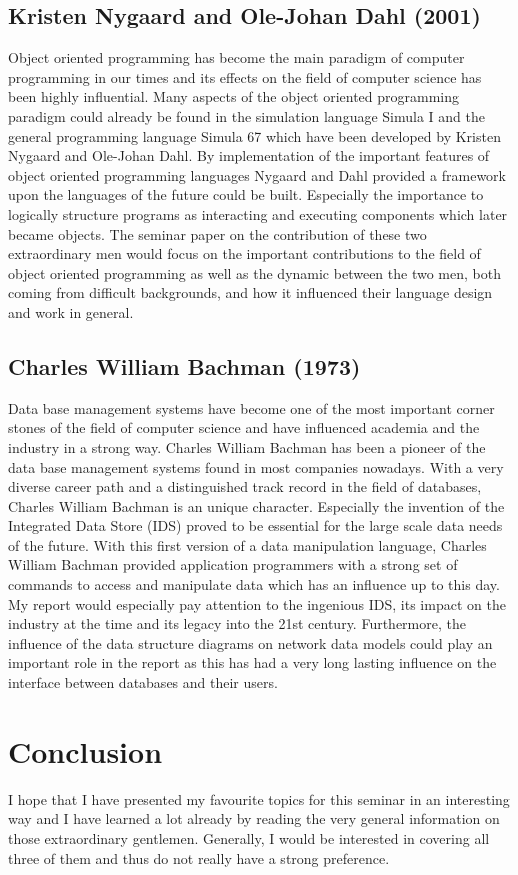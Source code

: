 \documentclass{article}
\begin{document}
\subsection{Kristen Nygaard and Ole-Johan Dahl (2001)}

Object oriented programming has become the main paradigm of computer programming in our times and its effects on the field of computer science has been highly influential. Many aspects of the object oriented programming paradigm could already be found in the simulation language Simula I and the general programming language Simula 67 which have been developed by Kristen Nygaard and Ole-Johan Dahl. By implementation of the important features of object oriented programming languages Nygaard and Dahl provided a framework upon the languages of the future could be built. Especially the importance to logically structure programs as interacting and executing components which later became objects. The seminar paper on the contribution of these two extraordinary men would focus on the important contributions to the field of object oriented programming as well as the dynamic between the two men, both coming from difficult backgrounds, and how it influenced their language design and work in general.

\subsection{Charles William Bachman (1973)}

Data base management systems have become one of the most important corner stones of the field of computer science and have influenced academia and the industry in a strong way. Charles William Bachman has been a pioneer of the data base management systems found in most companies nowadays. With a very diverse career path and a distinguished track record in the field of databases, Charles William Bachman is an unique character. Especially the invention of the Integrated Data Store (IDS) proved to be essential for the large scale data needs of the future. With this first version of a data manipulation language, Charles William Bachman provided application programmers with a strong set of commands to access and manipulate data which has an influence up to this day. My report would especially pay attention to the ingenious IDS, its impact on the industry at the time and its legacy into the 21st century. Furthermore, the influence of the data structure diagrams on network data models could play an important role in the report as this has had a very long lasting influence on the interface between databases and their users.

\section{Conclusion}

I hope that I have presented my favourite topics for this seminar in an interesting way and I have learned a lot already by reading the very general information on those extraordinary gentlemen. Generally, I would be interested in covering all three of them and thus do not really have a strong preference.
\end{document}
